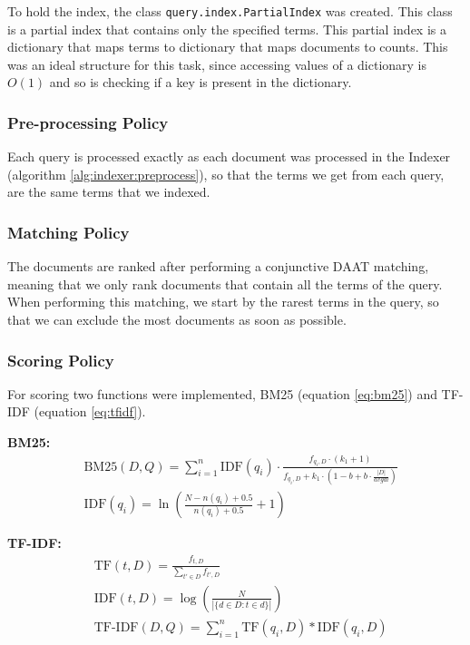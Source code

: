 \documentclass[sigconf,authorversion,nonacm]{acmart}
\def\code#1{\texttt{#1}}
\begin{document}
To hold the index, the class \code{query.index.PartialIndex} was created. This class is a partial index that contains only the specified terms. This partial index is a dictionary that maps terms to dictionary that maps documents to counts. This was an ideal structure for this task, since accessing values of a dictionary is $O(1)$ and so is checking if a key is present in the dictionary.

\subsubsection{Pre-processing Policy}

Each query is processed exactly as each document was processed in the Indexer (algorithm \ref{alg:indexer:preprocess}), so that the terms we get from each query, are the same terms that we indexed.

\subsubsection{Matching Policy}

The documents are ranked after performing a conjunctive DAAT matching, meaning that we only rank documents that contain all the terms of the query. When performing this matching, we start by the rarest terms in the query, so that we can exclude the most documents as soon as possible.

\subsubsection{Scoring Policy}

For scoring two functions were implemented, BM25 (equation \ref{eq:bm25}) and TF-IDF (equation \ref{eq:tfidf}).

\textbf{BM25:}
\begin{align}
   & \text{BM25}(D, Q) = \sum_{i=1}^n \text
  {IDF}(q_i) \cdot \frac{f_{q_i, D}\cdot(k_1 + 1)}{f_{q_i, D} + k_1 \cdot \left(1-b+b\cdot \frac{|D|}{avgdl}\right)} \nonumber \\
   & \text{IDF}(q_i) = \ln\left(\frac{N - n(q_i) + 0.5}{n(q_i)+0.5} + 1\right) \label{eq:bm25}
\end{align}

\textbf{TF-IDF:}
\begin{align}
   & \text{TF}(t, D) = \frac{f_{t,D}}{\sum_{t'\in D} f_{t',D}} \nonumber                    \\
   & \text{IDF}(t, D) = \log\left(\frac{N}{|\{d \in D : t \in d\}|}\right) \label{eq:tfidf} \\
   & \text{TF-IDF}(D, Q) = \sum_{i=1}^n \text{TF}(q_i, D)*\text{IDF}(q_i,D) \nonumber
\end{align}
\end{document}
